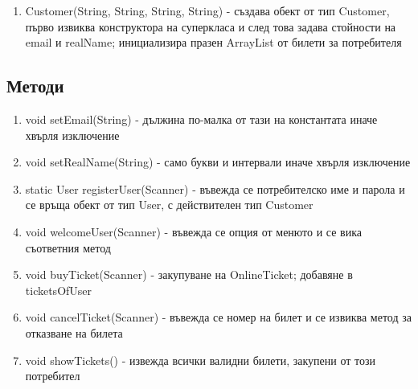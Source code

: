 \documentclass[12pt]{article}
\begin{document}
        \begin{enumerate}
            \item Customer(String, String, String, String) - създава обект от тип Customer, първо извиква конструктора на суперкласа и след това задава стойности на email и realName; инициализира празен ArrayList от билети за потребителя
        \end{enumerate}

    \subsection{Методи}

        \begin{enumerate}
            \item void setEmail(String) - дължина по-малка от тази на константата иначе хвърля изключение
            \item void setRealName(String) - само букви и интервали иначе хвърля изключение
            \item static User registerUser(Scanner) - въвежда се потребителско име и парола и се връща обект от тип User, с действителен тип Customer
            \item void welcomeUser(Scanner) - въвежда се опция от менюто и се вика съответния метод
            \item void buyTicket(Scanner) - закупуване на OnlineTicket; добавяне в ticketsOfUser
            \item void cancelTicket(Scanner) - въвежда се номер на билет и се извиква метод за отказване на билета
            \item void showTickets() - извежда всички валидни билети, закупени от този потребител
        \end{enumerate}
\end{document}
